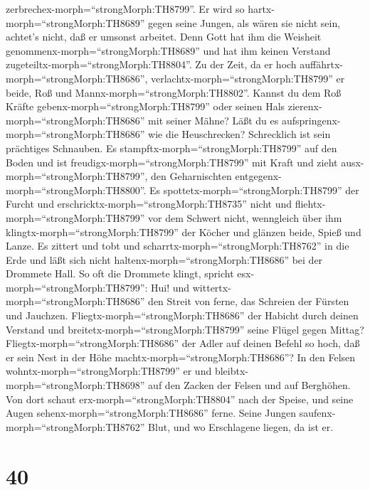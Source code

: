 zerbrechex-morph=``strongMorph:TH8799''.  Er wird so
hartx-morph=``strongMorph:TH8689'' gegen seine Jungen, als wären sie
nicht sein, achtet's nicht, daß er umsonst arbeitet.  Denn
Gott hat ihm die Weisheit genommenx-morph=``strongMorph:TH8689'' und hat
ihm keinen Verstand zugeteiltx-morph=``strongMorph:TH8804''.
 Zu der Zeit, da er hoch
auffährtx-morph=``strongMorph:TH8686'',
verlachtx-morph=``strongMorph:TH8799'' er beide, Roß und
Mannx-morph=``strongMorph:TH8802''.  Kannst du dem Roß
Kräfte gebenx-morph=``strongMorph:TH8799'' oder seinen Hals
zierenx-morph=``strongMorph:TH8686'' mit seiner Mähne? 
Läßt du es aufspringenx-morph=``strongMorph:TH8686'' wie die
Heuschrecken? Schrecklich ist sein prächtiges Schnauben. 
Es stampftx-morph=``strongMorph:TH8799'' auf den Boden und ist
freudigx-morph=``strongMorph:TH8799'' mit Kraft und zieht
ausx-morph=``strongMorph:TH8799'', den Geharnischten
entgegenx-morph=``strongMorph:TH8800''.  Es
spottetx-morph=``strongMorph:TH8799'' der Furcht und
erschricktx-morph=``strongMorph:TH8735'' nicht und
fliehtx-morph=``strongMorph:TH8799'' vor dem Schwert nicht,
 wenngleich über ihm klingtx-morph=``strongMorph:TH8799''
der Köcher und glänzen beide, Spieß und Lanze.  Es zittert
und tobt und scharrtx-morph=``strongMorph:TH8762'' in die Erde und läßt
sich nicht haltenx-morph=``strongMorph:TH8686'' bei der Drommete Hall.
 So oft die Drommete klingt, spricht
esx-morph=``strongMorph:TH8799'': Hui! und
wittertx-morph=``strongMorph:TH8686'' den Streit von ferne, das Schreien
der Fürsten und Jauchzen. 
Fliegtx-morph=``strongMorph:TH8686'' der Habicht durch deinen Verstand
und breitetx-morph=``strongMorph:TH8799'' seine Flügel gegen Mittag?
 Fliegtx-morph=``strongMorph:TH8686'' der Adler auf deinen
Befehl so hoch, daß er sein Nest in der Höhe
machtx-morph=``strongMorph:TH8686''?  In den Felsen
wohntx-morph=``strongMorph:TH8799'' er und
bleibtx-morph=``strongMorph:TH8698'' auf den Zacken der Felsen und auf
Berghöhen.  Von dort schaut
erx-morph=``strongMorph:TH8804'' nach der Speise, und seine Augen
sehenx-morph=``strongMorph:TH8686'' ferne.  Seine Jungen
saufenx-morph=``strongMorph:TH8762'' Blut, und wo Erschlagene liegen, da
ist er.

\hypertarget{section-39}{%
\section{40}\label{section-39}}

